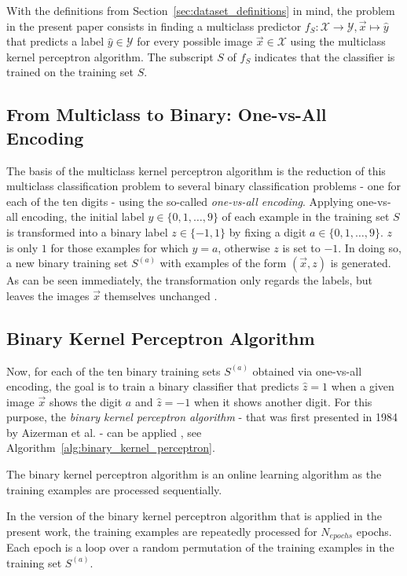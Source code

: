 With the definitions from Section~\ref{sec:dataset_definitions} in mind, the problem in the present paper consists in finding a multiclass predictor $f_S: \mathcal{X} \rightarrow \mathcal{Y}, \vec{x} \mapsto \hat{y}$ that predicts a label $\hat{y} \in \mathcal{Y}$ for every possible image $\vec{x} \in \mathcal{X}$ using the multiclass kernel perceptron algorithm. The subscript $S$ of $f_S$ indicates that the classifier is trained on the training set $S$.

\subsection{From Multiclass to Binary: One-vs-All Encoding}

The basis of the multiclass kernel perceptron algorithm is the reduction of this multiclass classification problem to several binary classification problems - one for each of the ten digits - using the so-called \textit{one-vs-all encoding}. Applying one-vs-all encoding, the initial label $y \in \{0, 1, \dots, 9\}$ of each example in the training set $S$ is transformed into a binary label $z \in \{-1, 1\}$ by fixing a digit $a \in \{0, 1, \dots, 9\}$. $z$ is only $1$ for those examples for which $y=a$, otherwise $z$ is set to $-1$. In doing so, a new binary training set $S^{(a)}$ with examples of the form $(\vec{x}, z)$ is generated. As can be seen immediately, the transformation only regards the labels, but leaves the images $\vec{x}$ themselves unchanged \cite{multiclass2005}.

\subsection{Binary Kernel Perceptron Algorithm}
Now, for each of the ten binary training sets $S^{(a)}$ obtained via one-vs-all encoding, the goal is to train a binary classifier that predicts $\hat{z}=1$ when  a given image $\vec{x}$ shows the digit $a$ and $\hat{z}=-1$ when it shows another digit. For this purpose, the \textit{binary kernel perceptron algorithm} - that was first presented in 1984 by Aizerman et al. - can be applied \cite{kernel1964}, see Algorithm~\ref{alg:binary_kernel_perceptron}. 

The binary kernel perceptron algorithm is an online learning algorithm as the training examples are processed sequentially. 

In the version of the binary kernel perceptron algorithm that is applied in the present work, the training examples are repeatedly processed for $N_{epochs}$ epochs. Each epoch is a loop over a random permutation of the training examples in the training set $S^{(a)}$.\\ 

